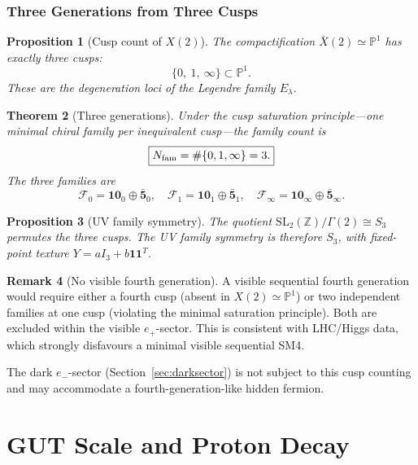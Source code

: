 \documentclass[12pt]{article}
\theoremstyle{plain}
\newtheorem{theorem}{Theorem}[section]
\newtheorem{proposition}[theorem]{Proposition}
\theoremstyle{definition}
\newtheorem{remark}[theorem]{Remark}
\numberwithin{equation}{section}
\begin{document}
\section{Three Generations from Three Cusps}\label{sec:generations}

\begin{proposition}[Cusp count of $X(2)$]
The compactification $\bar{X}(2)\simeq\mathbb{P}^1$ has exactly three cusps:
\[
\{0,\ 1,\ \infty\}\subset\mathbb{P}^1.
\]
These are the degeneration loci of the Legendre family $E_\lambda$.
\end{proposition}

\begin{theorem}[Three generations]\label{thm:threegen}
Under the cusp saturation principle---one minimal chiral family per
inequivalent cusp---the family count is
\[
\boxed{N_{\rm fam} = \#\{0,1,\infty\} = 3.}
\]
The three families are
\[
\mathcal{F}_0=\mathbf{10}_0\oplus\bar{\mathbf{5}}_0,\quad
\mathcal{F}_1=\mathbf{10}_1\oplus\bar{\mathbf{5}}_1,\quad
\mathcal{F}_\infty=\mathbf{10}_\infty\oplus\bar{\mathbf{5}}_\infty.
\]
\end{theorem}

\begin{proposition}[UV family symmetry]
The quotient $\mathrm{SL}_2(\mathbb{Z})/\Gamma(2)\cong S_3$ permutes the
three cusps.  The UV family symmetry is therefore $S_3$, with fixed-point
texture $Y=aI_3+b\mathbf{1}\mathbf{1}^T$.
\end{proposition}

\begin{remark}[No visible fourth generation]
A visible sequential fourth generation would require either a fourth cusp
(absent in $X(2)\simeq\mathbb{P}^1$) or two independent families at one
cusp (violating the minimal saturation principle).  Both are excluded within
the visible $e_+$-sector.  This is consistent with LHC/Higgs data, which
strongly disfavours a minimal visible sequential SM4.

The dark $e_-$-sector (Section~\ref{sec:darksector}) is not subject to
this cusp counting and may accommodate a fourth-generation-like hidden
fermion.
\end{remark}

\part{GUT Scale and Proton Decay}
\end{document}
